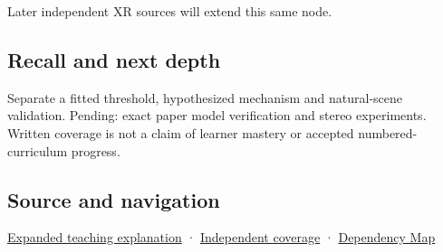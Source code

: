 Later independent XR sources will extend this same node.

\subsection{Recall and next depth}\label{appendix-8dc848f14052-recall-and-next-depth}

Separate a fitted threshold, hypothesized mechanism and natural-scene validation. Pending: exact paper model verification and stereo experiments. Written coverage is not a claim of learner mastery or accepted numbered-curriculum progress.

\subsection{Source and navigation}\label{appendix-8dc848f14052-source-and-navigation}

\hyperref[04-visual-computing-ii-ch042-binocular-depth-changes-the-optimization-question]{Expanded teaching explanation} · \hyperref[appendix-fd090d982a15-xr01---independent-seeing-and-representation-source]{Independent coverage} · \hyperref[appendix-4ad47bdd269a]{Dependency Map}
